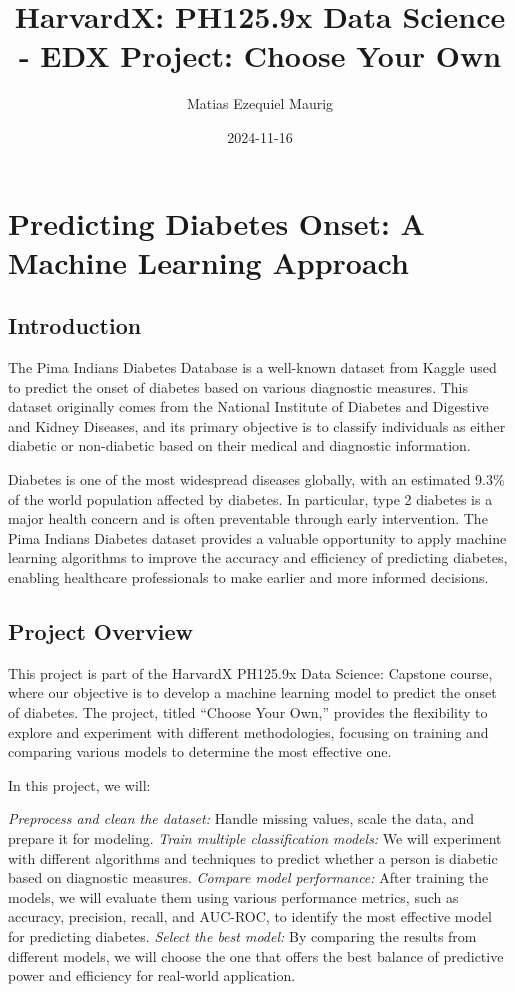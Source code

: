 \documentclass[
]{article}
\title{HarvardX: PH125.9x Data Science - EDX Project: Choose Your Own}
\author{Matias Ezequiel Maurig}
\date{2024-11-16}
\begin{document}
\maketitle

{
\setcounter{tocdepth}{3}
\tableofcontents
}
\newpage

\section{Predicting Diabetes Onset: A Machine Learning
Approach}\label{predicting-diabetes-onset-a-machine-learning-approach}

\subsection{Introduction}\label{introduction}

The Pima Indians Diabetes Database is a well-known dataset from Kaggle
used to predict the onset of diabetes based on various diagnostic
measures. This dataset originally comes from the National Institute of
Diabetes and Digestive and Kidney Diseases, and its primary objective is
to classify individuals as either diabetic or non-diabetic based on
their medical and diagnostic information.

Diabetes is one of the most widespread diseases globally, with an
estimated 9.3\% of the world population affected by diabetes. In
particular, type 2 diabetes is a major health concern and is often
preventable through early intervention. The Pima Indians Diabetes
dataset provides a valuable opportunity to apply machine learning
algorithms to improve the accuracy and efficiency of predicting
diabetes, enabling healthcare professionals to make earlier and more
informed decisions.

\subsection{Project Overview}\label{project-overview}

This project is part of the HarvardX PH125.9x Data Science: Capstone
course, where our objective is to develop a machine learning model to
predict the onset of diabetes. The project, titled ``Choose Your Own,''
provides the flexibility to explore and experiment with different
methodologies, focusing on training and comparing various models to
determine the most effective one.

In this project, we will:

\emph{Preprocess and clean the dataset:} Handle missing values, scale
the data, and prepare it for modeling. \emph{Train multiple
classification models:} We will experiment with different algorithms and
techniques to predict whether a person is diabetic based on diagnostic
measures. \emph{Compare model performance:} After training the models,
we will evaluate them using various performance metrics, such as
accuracy, precision, recall, and AUC-ROC, to identify the most effective
model for predicting diabetes. \emph{Select the best model:} By
comparing the results from different models, we will choose the one that
offers the best balance of predictive power and efficiency for
real-world application.
\end{document}
